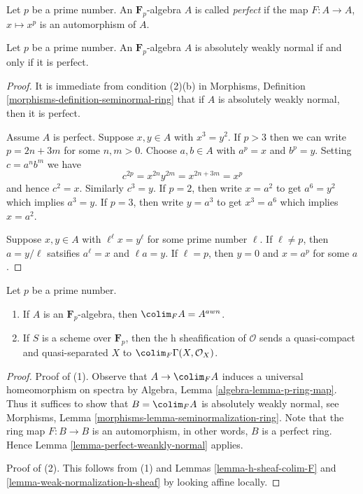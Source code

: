 \noindent
Let $p$ be a prime number. An $\mathbf{F}_p$-algebra $A$ is
called {\it perfect} if the map $F : A \to A$, $x \mapsto x^p$
is an automorphism of $A$.

\begin{lemma}
\label{lemma-perfect-weankly-normal}
Let $p$ be a prime number. An $\mathbf{F}_p$-algebra $A$ is
absolutely weakly normal if and only if it is perfect.
\end{lemma}

\begin{proof}
It is immediate from condition (2)(b) in
Morphisms, Definition \ref{morphisms-definition-seminormal-ring}
that if $A$ is absolutely weakly normal, then it is perfect.

\medskip\noindent
Assume $A$ is perfect. Suppose $x, y \in A$ with $x^3 = y^2$.
If $p > 3$ then we can write $p = 2n + 3m$ for some $n, m > 0$.
Choose $a, b \in A$ with $a^p = x$ and $b^p = y$.
Setting $c = a^n b^m$ we have
$$
c^{2p} = x^{2n} y^{2m} = x^{2n + 3m} = x^p
$$
and hence $c^2 = x$. Similarly $c^3 = y$. If $p = 2$, then
write $x = a^2$ to get $a^6 = y^2$ which implies $a^3 = y$.
If $p = 3$, then write $y = a^3$ to get $x^3 = a^6$ which
implies $x = a^2$.

\medskip\noindent
Suppose $x, y \in A$ with $\ell^\ell x = y^\ell$ for some prime
number $\ell$. If $\ell \not = p$, then $a = y/\ell$ satsifies
$a^\ell = x$ and $\ell a = y$. If $\ell = p$, then
$y = 0$ and $x = a^p$ for some $a$.
\end{proof}

\begin{lemma}
\label{lemma-char-p}
Let $p$ be a prime number.
\begin{enumerate}
\item If $A$ is an $\mathbf{F}_p$-algebra, then $\colim_F A = A^{awn}$.
\item If $S$ is a scheme over $\mathbf{F}_p$, then the
h sheafification of $\mathcal{O}$ sends a quasi-compact
and quasi-separated $X$ to $\colim_F \Gamma(X, \mathcal{O}_X)$.
\end{enumerate}
\end{lemma}

\begin{proof}
Proof of (1). Observe that $A \to \colim_F A$ induces a
universal homeomorphism on spectra by
Algebra, Lemma \ref{algebra-lemma-p-ring-map}.
Thus it suffices to show that $B = \colim_F A$ is
absolutely weakly normal, see
Morphisms, Lemma \ref{morphisms-lemma-seminormalization-ring}.
Note that the ring map $F : B \to B$ is an automorphism,
in other words, $B$ is a perfect ring. Hence
Lemma \ref{lemma-perfect-weankly-normal} applies.

\medskip\noindent
Proof of (2). This follows from (1) and
Lemmas \ref{lemma-h-sheaf-colim-F} and
\ref{lemma-weak-normalization-h-sheaf}
by looking affine locally.
\end{proof}






